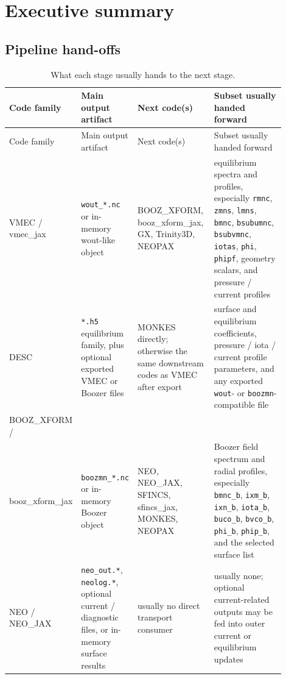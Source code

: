 \documentclass[11pt]{article}
\newcommand{\code}[1]{\texttt{#1}}
\begin{document}
\section{Executive summary}

\subsection{Pipeline hand-offs}

{\small
\begin{longtable}{L{0.14\linewidth}L{0.19\linewidth}L{0.28\linewidth}L{0.29\linewidth}}
\caption{What each stage usually hands to the next stage.}
\label{tab:handoffs}\\
\toprule
Code family & Main output artifact & Next code(s) & Subset usually handed forward \\
\midrule
\endfirsthead
\toprule
Code family & Main output artifact & Next code(s) & Subset usually handed forward \\
\midrule
\endhead
VMEC / vmec\_jax &
\code{wout\_*.nc} or in-memory wout-like object &
BOOZ\_XFORM, booz\_xform\_jax, GX, Trinity3D, NEOPAX &
equilibrium spectra and profiles, especially \code{rmnc}, \code{zmns},
\code{lmns}, \code{bmnc}, \code{bsubumnc}, \code{bsubvmnc}, \code{iotas},
\code{phi}, \code{phipf}, geometry scalars, and pressure / current profiles \\

DESC &
\code{*.h5} equilibrium family, plus optional exported VMEC or Boozer files &
MONKES directly; otherwise the same downstream codes as VMEC after export &
surface and equilibrium coefficients, pressure / iota / current profile
parameters, and any exported \code{wout}- or \code{boozmn}-compatible file \\

BOOZ\_XFORM /\\ booz\_xform\_jax &
\code{boozmn\_*.nc} or in-memory Boozer object &
NEO, NEO\_JAX, SFINCS, sfincs\_jax, MONKES, NEOPAX &
Boozer field spectrum and radial profiles, especially \code{bmnc\_b},
\code{ixm\_b}, \code{ixn\_b}, \code{iota\_b}, \code{buco\_b},
\code{bvco\_b}, \code{phi\_b}, \code{phip\_b}, and the selected surface list \\

NEO / NEO\_JAX &
\code{neo\_out.*}, \code{neolog.*}, optional current / diagnostic files, or
in-memory surface results &
usually no direct transport consumer &
usually none; optional current-related outputs may be fed into outer current or
equilibrium updates \\


\end{longtable}}
\end{document}
